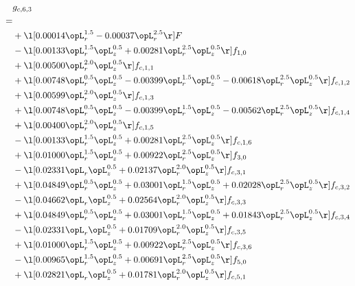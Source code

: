 \begin{alignat}{2} 
\label{eq:g_63_0} 
& g_{c,6,3} \nonumber \\ 
 = \\ 
& + \l[  0.00014 \opL_r^{1.5}   -0.00037 \opL_r^{2.5}  \r] F \nonumber \\ 
& - \l[  0.00133 \opL_r^{1.5} \opL_z^{0.5} +  0.00281 \opL_r^{2.5} \opL_z^{0.5}  \r] f_{1,0} \nonumber \\ 
& + \l[  0.00500 \opL_r^{2.0} \opL_z^{0.5}  \r] f_{c,1,1} \nonumber \\ 
& + \l[  0.00748 \opL_r^{0.5} \opL_z^{0.5}   -0.00399 \opL_r^{1.5} \opL_z^{0.5}   -0.00618 \opL_r^{2.5} \opL_z^{0.5}  \r] f_{c,1,2} \nonumber \\ 
& + \l[  0.00599 \opL_r^{2.0} \opL_z^{0.5}  \r] f_{c,1,3} \nonumber \\ 
& + \l[  0.00748 \opL_r^{0.5} \opL_z^{0.5}   -0.00399 \opL_r^{1.5} \opL_z^{0.5}   -0.00562 \opL_r^{2.5} \opL_z^{0.5}  \r] f_{c,1,4} \nonumber \\ 
& + \l[  0.00400 \opL_r^{2.0} \opL_z^{0.5}  \r] f_{c,1,5} \nonumber \\ 
& - \l[  0.00133 \opL_r^{1.5} \opL_z^{0.5} +  0.00281 \opL_r^{2.5} \opL_z^{0.5}  \r] f_{c,1,6} \nonumber \\ 
& + \l[  0.01000 \opL_r^{1.5} \opL_z^{0.5} +  0.00922 \opL_r^{2.5} \opL_z^{0.5}  \r] f_{3,0} \nonumber \\ 
& - \l[  0.02331 \opL_r \opL_z^{0.5} +  0.02137 \opL_r^{2.0} \opL_z^{0.5}  \r] f_{c,3,1} \nonumber \\ 
& + \l[  0.04849 \opL_r^{0.5} \opL_z^{0.5} +  0.03001 \opL_r^{1.5} \opL_z^{0.5} +  0.02028 \opL_r^{2.5} \opL_z^{0.5}  \r] f_{c,3,2} \nonumber \\ 
& - \l[  0.04662 \opL_r \opL_z^{0.5} +  0.02564 \opL_r^{2.0} \opL_z^{0.5}  \r] f_{c,3,3} \nonumber \\ 
& + \l[  0.04849 \opL_r^{0.5} \opL_z^{0.5} +  0.03001 \opL_r^{1.5} \opL_z^{0.5} +  0.01843 \opL_r^{2.5} \opL_z^{0.5}  \r] f_{c,3,4} \nonumber \\ 
& - \l[  0.02331 \opL_r \opL_z^{0.5} +  0.01709 \opL_r^{2.0} \opL_z^{0.5}  \r] f_{c,3,5} \nonumber \\ 
& + \l[  0.01000 \opL_r^{1.5} \opL_z^{0.5} +  0.00922 \opL_r^{2.5} \opL_z^{0.5}  \r] f_{c,3,6} \nonumber \\ 
& - \l[  0.00965 \opL_r^{1.5} \opL_z^{0.5} +  0.00691 \opL_r^{2.5} \opL_z^{0.5}  \r] f_{5,0} \nonumber \\ 
& + \l[  0.02821 \opL_r \opL_z^{0.5} +  0.01781 \opL_r^{2.0} \opL_z^{0.5}  \r] f_{c,5,1} \nonumber \\ 

\end{alignat}
